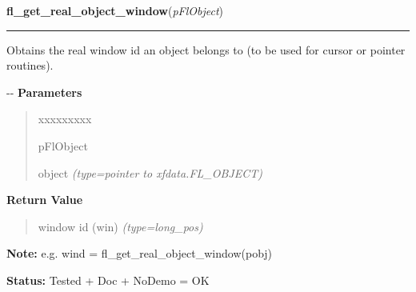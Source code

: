 \hspace{.8\funcindent}\begin{boxedminipage}{\funcwidth}

    \raggedright \textbf{fl\_get\_real\_object\_window}(\textit{pFlObject})

    \vspace{-1.5ex}

    \rule{\textwidth}{0.5\fboxrule}
\setlength{\parskip}{2ex}

Obtains the real window id an object belongs to (to be used for
cursor or pointer routines).

-{}-
\setlength{\parskip}{1ex}
      \textbf{Parameters}
      \vspace{-1ex}

      \begin{quote}
        \begin{Ventry}{xxxxxxxxx}

          \item[pFlObject]


object
            {\it (type=pointer to xfdata.FL\_OBJECT)}

        \end{Ventry}

      \end{quote}

      \textbf{Return Value}
    \vspace{-1ex}

      \begin{quote}

window id (win)
      {\it (type=long\_pos)}

      \end{quote}

\textbf{Note:} 
e.g. wind = fl\_get\_real\_object\_window(pobj)


\textbf{Status:} 
Tested + Doc + NoDemo = OK


    \end{boxedminipage}

    \label{xformslib:flxbasic:FL_ObjWin}

    \vspace{0.5ex}


